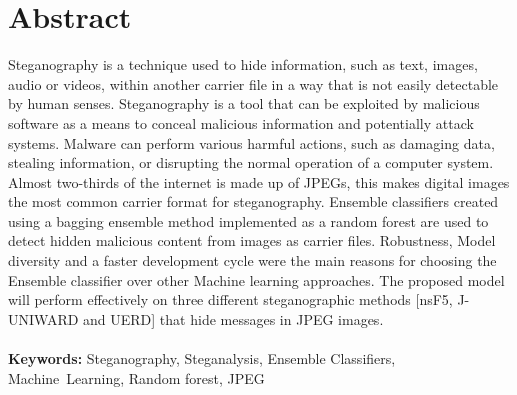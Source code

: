 \chapter*{Abstract} 
\thispagestyle{plain}
\setcounter{page}{1}
\sloppy
Steganography is a technique used to hide information, such as text, images, audio or videos, within another carrier file in a way that is not easily detectable by human senses. Steganography is a tool that can be exploited by malicious software as a means to conceal malicious information and potentially attack systems. Malware can perform various harmful actions, such as damaging data, stealing information, or disrupting the normal operation of a computer system. Almost two-thirds of the internet is made up of JPEGs, this makes digital images the most common carrier format for steganography. Ensemble classifiers created using a bagging ensemble method implemented as a random forest are used to detect hidden malicious content from images as carrier files. Robustness, Model diversity and a faster development cycle were the main reasons for choosing the Ensemble classifier over other Machine learning approaches. The proposed model will perform effectively on three different steganographic methods [nsF5, J-UNIWARD and UERD]  that hide messages in JPEG images.\\ \\
\normalsize{\textbf{Keywords:} Steganography, Steganalysis, Ensemble Classifiers, \mbox{Machine Learning}, Random forest, JPEG }


